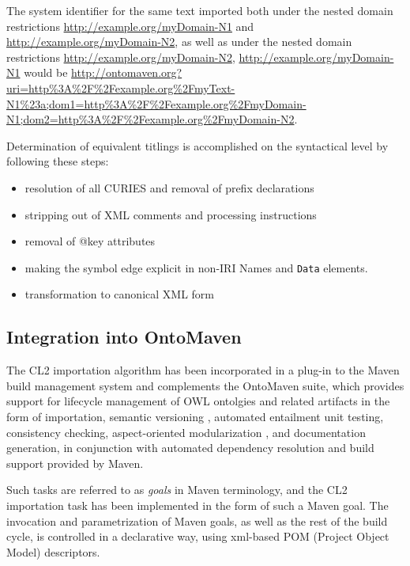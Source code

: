 \documentclass{IOS-Book-Article}
\begin{document}
The system identifier for the same text imported both under the nested domain restrictions \url{http://example.org/myDomain-N1} and \url{http://example.org/myDomain-N2}, as well as under the nested domain restrictions \url{http://example.org/myDomain-N2}, \url{http://example.org/myDomain-N1} would be \url{http://ontomaven.org?uri=http\%3A\%2F\%2Fexample.org\%2FmyText-N1\%23a;dom1=http\%3A\%2F\%2Fexample.org\%2FmyDomain-N1;dom2=http\%3A\%2F\%2Fexample.org\%2FmyDomain-N2}.

Determination of equivalent titlings is accomplished on the syntactical level by following these steps:

\begin{itemize}
\item resolution of all CURIES and removal of prefix declarations
\item stripping out of XML comments and processing instructions
\item removal of @key attributes
\item making the symbol edge explicit in non-IRI Names and \texttt{Data} elements.
\item transformation to canonical XML form
\end{itemize}

\subsection{Integration into OntoMaven}

The CL2 importation algorithm has been incorporated in a plug-in to the Maven build management system and complements the OntoMaven suite, which provides support for lifecycle management of OWL ontolgies and related artifacts in the form of importation, semantic versioning \cite{Luczak-RoschCPRT10}, automated entailment unit testing, consistency checking, aspect-oriented modularization \cite{schafermeier:2014aa}, and documentation generation, in conjunction with automated dependency resolution and build support provided by Maven.

Such tasks are referred to as \emph{goals} in Maven terminology, and the CL2 importation task has been implemented in the form of such a Maven goal. The invocation and parametrization of Maven goals, as well as the rest of the build cycle, is controlled in a declarative way, using xml-based POM (Project Object Model) descriptors.
\end{document}
